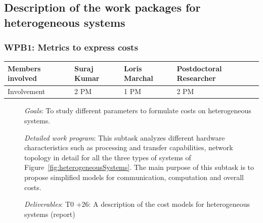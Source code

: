 \documentclass[a4paper,11pt]{article}
\newcommand{\subtask}[1]{{\color{orange}\paragraph{#1}$ $}}
\newcommand{\goal}{{\color{orange2}  \emph{Goals}:} }
\newcommand{\dwp}{{\color{orange2}  \emph{Detailed work program}: }}
\newcommand{\deliverables}{{\color{orange2}  \emph{Deliverables}: }}
\begin{document}
	
	\subsection{Description of the work packages for heterogeneous systems}
	\label{sec:org:wp:hetero}
	
	
	\subsubsection{\textbf{WPB1}: Metrics to express costs}
	\begin{table}[H]
		\begin{tabular}{llll}
			\hline
			\cellcolor{blue2}
			Members involved & Suraj Kumar& Loris Marchal & Postdoctoral Researcher \\
			\hline
			\cellcolor{orange2}
			Involvement      & 2 PM            & 1 PM & 2 PM \\
			\hline
		\end{tabular}
	\end{table}
	\begin{description}
		\item[] \goal To study different parameters to formulate costs on heterogeneous systems.
		\item[] \dwp This subtask analyzes different hardware characteristics such as processing and transfer capabilities, network topology in detail for all the three types of systems of Figure~\ref{fig:heterogeneousSystems}. The main purpose of this subtask is to propose simplified models for communication, computation and overall costs. 
		\item[] \deliverables\newline
		T0 +26: A description of the cost models for heterogeneous systems (report) 
	\end{description}
	
\end{document}
